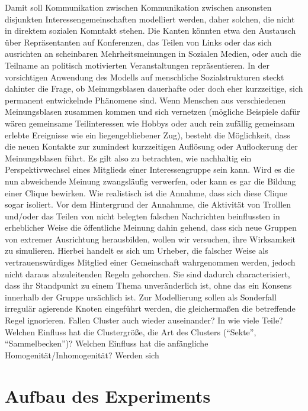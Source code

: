 \documentclass[11pt, a4paper]{scrartcl}
\begin{document}
Damit soll Kommunikation zwischen Kommunikation zwischen ansonsten disjunkten Interessengemeinschaften modelliert werden, daher solchen, die nicht in direktem sozialen Komntakt stehen. Die Kanten könnten etwa den Austausch über Repräsentanten auf Konferenzen,  das Teilen von Links oder das sich ausrichten an scheinbaren Mehrheitsmeinungen in Sozialen Medien, oder auch die Teilname an politisch motivierten Veranstaltungen repräsentieren.
In der vorsichtigen Anwendung des Modells auf menschliche Sozialstrukturen steckt dahinter die Frage, ob Meinungsblasen dauerhafte oder doch eher kurzzeitige, sich permanent entwickelnde Phänomene sind. Wenn Menschen aus verschiedenen Meinungsblasen zusammen kommen und sich vernetzen (mögliche Beispiele dafür wären gemeinsame Teilinteressen wie Hobbys oder auch rein zufällig gemeinsam erlebte Ereignisse wie ein liegengebliebener Zug), besteht die Möglichkeit, dass die neuen Kontakte zur zumindest kurzzeitigen Auflösung oder Auflockerung der Meinungsblasen führt. 
Es gilt also zu betrachten, wie nachhaltig ein Perspektivwechsel eines Mitglieds einer Interessengruppe sein kann. Wird es die nun abweichende Meinung zwangsläufig verwerfen, oder kann es gar die Bildung einer Clique bewirken. Wie realistisch ist die Annahme, dass sich diese Clique sogar isoliert. 
Vor dem Hintergrund der Annahmme, die Aktivität von Trolllen und/oder das Teilen von nicht belegten falschen Nachrichten beinflussten in erheblicher Weise die öffentliche Meinung dahin gehend, dass sich neue Gruppen von  extremer Ausrichtung herausbilden, wollen wir versuchen, ihre Wirksamkeit zu simulieren.
Hierbei handelt es sich um Urheber, die falscher Weise als vertrauenswürdiges Mitglied einer Gemeinschaft  wahrgenommen werden, jedoch nicht daraus abzuleitenden Regeln gehorchen.
Sie sind dadurch characterisiert, dass ihr Standpunkt zu einem Thema unveränderlich ist, ohne das ein Konsens innerhalb der Gruppe ursächlich ist.
Zur Modellierung sollen als Sonderfall irregulär agierende Knoten eingeführt werden, die gleichermaßen die betreffende Regel ignorieren.
Fallen Cluster auch wieder auseinander? In wie viele Teile? Welchen Einfluss hat die Clustergröße, die Art des Clusters ("`Sekte"', "`Sammelbecken"')? Welchen Einfluss hat die anfängliche Homogenität/Inhomogenität?
Werden sich 


\section{Aufbau des Experiments}
\end{document}
